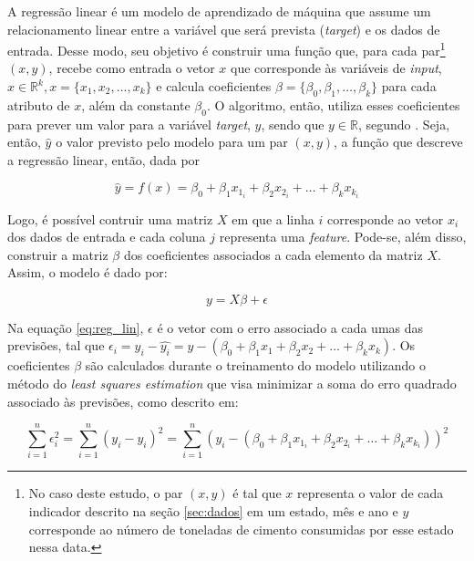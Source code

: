 A regressão linear é um modelo de aprendizado de máquina que assume um relacionamento
linear entre a variável que será prevista (\textit{target}) e os dados de entrada.
Desse modo, seu objetivo é construir uma 
função que, para cada par\footnote{No
caso deste estudo, o par  $(x,y)$ é tal que 
$x$ representa o valor de cada
indicador descrito na seção \ref{sec:dados} em um estado, mês e ano e 
$y$ corresponde ao número de toneladas de cimento consumidas
por esse estado nessa data.} $(x,y)$, recebe como
entrada o vetor $x$ que corresponde às variáveis de \textit{input},
$x \in \mathbb{R}^k , x=\{x_1, x_2, ..., x_k\}$ e calcula coeficientes
$\beta = \{\beta_0, \beta_1, \dots, \beta_k\}$ para cada atributo de $x$,
além da constante $\beta_0$. O algoritmo, então, utiliza esses coeficientes para
prever um valor para a variável \textit{target}, $y$, sendo 
que $y \in \mathbb{R}$, segundo \cite{forecasting}. Seja,
então, $\hat{y}$ o valor previsto pelo modelo para um 
par $(x, y)$, a função que descreve a 
regressão linear, então, dada por

\begin{equation}
  \hat{y} = f(x) = \beta_0 + \beta_1 x_{1_i} + \beta_2 x_{2_i} + \dots + \beta_k x_{k_i} 
\end{equation}

Logo, é possível contruir uma matriz $X$ em que a linha $i$
corresponde ao vetor $x_i$ dos dados de entrada e 
cada coluna $j$ representa uma \textit{feature}. Pode-se, 
além disso, construir a matriz $\beta$ dos coeficientes associados 
a cada elemento da matriz $X$. Assim, o modelo
é dado por:

\begin{equation}
  \label{eq:reg_lin}
  y = X\beta + \epsilon
\end{equation}

Na equação \ref{eq:reg_lin}, $\epsilon$ é o vetor com o erro associado a cada umas 
das previsões, tal que $\epsilon_i = y_i - \hat{y_i} = y - (\beta_0 + \beta_1 x_1 + \beta_2 x_2 + \dots + \beta_k x_k )$.
Os coeficientes $\beta$ são calculados durante o treinamento 
do modelo utilizando o método do \textit{least squares estimation}
que visa minimizar a soma do erro quadrado associado às previsões, 
como descrito em:

\begin{equation}
  \sum_{i=1}^{n} \epsilon_i^2 = \sum_{i=1}^{n} (y_i - \hat{y_i})^2 = 
  \sum_{i=1}^{n} (y_i - (\beta_0 + \beta_1 x_{1_i} + \beta_2 x_{2_i} + \dots + \beta_k x_{k_i} ))^2
\end{equation}

